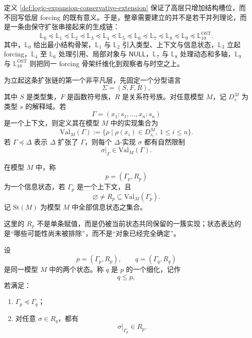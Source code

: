 定义 \ref{def:logic-expansion-conservative-extension} 保证了高层只增加结构槽位，而不回写低层 forcing 的既有意义。于是，整章需要建立的并不是若干并列理论，而是一条由保守扩张串接起来的生成链：
\[
\mathbb{L}_0
\preceq
\mathbb{L}_1
\preceq
\mathbb{L}_2
\preceq
\mathbb{L}_3
\preceq
\mathbb{L}_4
\preceq
\mathbb{L}_5
\preceq
\mathbb{L}_6
\preceq
\mathbb{L}_7
\preceq
\mathbb{L}_8
\preceq
\mathbb{L}_9
\preceq
\mathbb{L}_{10}^{\mathrm{OST}}.
\]
其中，\(\mathbb{L}_0\) 给出最小结构骨架，\(\mathbb{L}_1\) 与 \(\mathbb{L}_2\) 引入类型、上下文与信息状态，\(\mathbb{L}_3\) 立起 forcing，\(\mathbb{L}_4\) 至 \(\mathbb{L}_6\) 处理引用、局部对象与 \(\mathsf{NULL}\)，\(\mathbb{L}_7\) 与 \(\mathbb{L}_8\) 处理动态和多轴，\(\mathbb{L}_9\) 与 \(\mathbb{L}_{10}^{\mathrm{OST}}\) 则把同一 forcing 骨架纤维化到观察者与时空之上。

为立起这条扩张链的第一个非平凡层，先固定一个分型语言
\[
\Sigma=(S,F,R),
\]
其中 \(S\) 是类型集，\(F\) 是函数符号族，\(R\) 是关系符号族。对任意模型 \(M\)，记 \(D_s^M\) 为类型 \(s\) 的解释域。若
\[
\Gamma=(x_1:s_1,\dots,x_n:s_n)
\]
是一个上下文，则定义其在模型 \(M\) 中的实现集合为
\[
\mathrm{Val}_M(\Gamma)
:=
\bigl\{\rho \mid \rho(x_i)\in D_{s_i}^M,\ 1\le i\le n\bigr\}.
\]
若 \(\Gamma\preceq \Delta\) 表示 \(\Delta\) 扩张了 \(\Gamma\)，则每个 \(\Delta\)-实现 \(\sigma\) 都有自然限制
\[
\sigma|_\Gamma \in \mathrm{Val}_M(\Gamma).
\]

\begin{definition}[信息状态]\label{def:logic-expansion-information-state}
在模型 \(M\) 中，称
\[
p=(\Gamma_p,R_p)
\]
为一个信息状态，若 \(\Gamma_p\) 是一个上下文，且
\[
\varnothing\neq R_p\subseteq \mathrm{Val}_M(\Gamma_p).
\]
记 \(\mathrm{St}(M)\) 为模型 \(M\) 中全部信息状态之集合。
\end{definition}

这里的 \(R_p\) 不是单条赋值，而是仍被当前状态共同保留的一簇实现；状态表达的是“哪些可能性尚未被排除”，而不是“对象已经完全确定”。

\begin{definition}[细化]\label{def:logic-expansion-refinement}
设
\[
p=(\Gamma_p,R_p),
\qquad
q=(\Gamma_q,R_q)
\]
是同一模型 \(M\) 中的两个状态。称 \(q\) 是 \(p\) 的一个细化，记作
\[
q\le p,
\]
若满足：
\begin{enumerate}
  \item \(\Gamma_p\preceq \Gamma_q\)；
  \item 对任意 \(\sigma\in R_q\)，都有
  \[
  \sigma|_{\Gamma_p}\in R_p.
  \]
\end{enumerate}
\end{definition}

